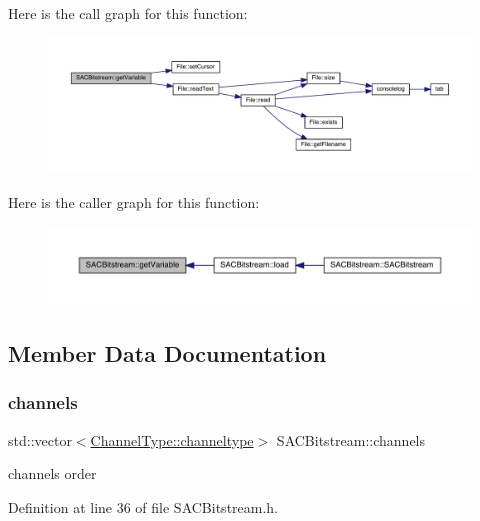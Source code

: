 Here is the call graph for this function\+:
\nopagebreak
\begin{figure}[H]
\begin{center}
\leavevmode
\includegraphics[width=350pt]{class_s_a_c_bitstream_ad0f39852ca2853efa15be087ce68c3b9_cgraph}
\end{center}
\end{figure}
Here is the caller graph for this function\+:
\nopagebreak
\begin{figure}[H]
\begin{center}
\leavevmode
\includegraphics[width=350pt]{class_s_a_c_bitstream_ad0f39852ca2853efa15be087ce68c3b9_icgraph}
\end{center}
\end{figure}


\subsection{Member Data Documentation}
\mbox{\label{class_s_a_c_bitstream_a385f676be794f5bb9bec896ef6eda43c}} 
\subsubsection{\texorpdfstring{channels}{channels}}
{\footnotesize\ttfamily std\+::vector$<$\hyperlink{struct_s_a_c_bitstream_1_1_channel_type_a31c32b34085c06a1c58d920ca28c17c9}{Channel\+Type\+::channeltype}$>$ S\+A\+C\+Bitstream\+::channels}

channels order 

Definition at line 36 of file S\+A\+C\+Bitstream.\+h.

\mbox{\label{class_s_a_c_bitstream_a94931a9831b06bba488d4f7b6f1e5744}} 
